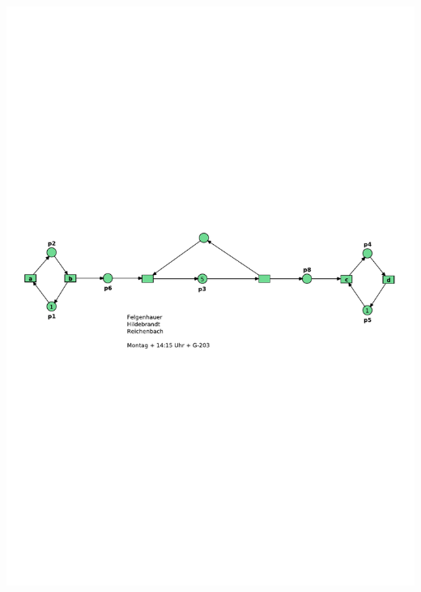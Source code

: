 \documentclass[12pt,a4paper]{../krautsourcing/homework}
\begin{document}
\subsection{}
\includegraphics[scale=0.8,trim={5mm 110mm 10mm 110mm},clip]{Aufgabe_6-4/Aufgabe_6-4-7.pdf}
\end{document}
